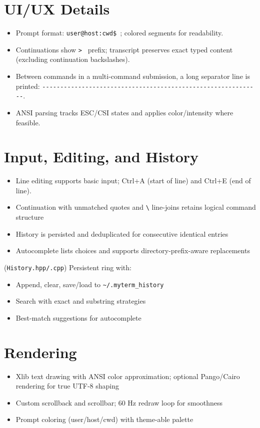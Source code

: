 \documentclass[11pt,a4paper]{article}
\begin{document}
\section{UI/UX Details}
\begin{itemize}[leftmargin=*]
  \item Prompt format: \verb!user@host:cwd$ !; colored segments for readability.
  \item Continuations show \verb!> ! prefix; transcript preserves exact typed content (excluding continuation backslashes).
  \item Between commands in a multi-command submission, a long separator line is printed: \verb!-------------------------------------------------------------!.
  \item ANSI parsing tracks ESC/CSI states and applies color/intensity where feasible.
\end{itemize}

\section{Input, Editing, and History}
\begin{itemize}[leftmargin=*]
  \item Line editing supports basic input; Ctrl+A (start of line) and Ctrl+E (end of line).
  \item Continuation with unmatched quotes and \texttt{\textbackslash} line-joins retains logical command structure
  \item History is persisted and deduplicated for consecutive identical entries
  \item Autocomplete lists choices and supports directory-prefix-aware replacements
\end{itemize}
(\texttt{History.hpp/.cpp}) Persistent ring with:
\begin{itemize}[leftmargin=*]
  \item Append, clear, save/load to \texttt{\textasciitilde/.myterm\_history}
  \item Search with exact and substring strategies
  \item Best-match suggestions for autocomplete
\end{itemize}

\section{Rendering}
\begin{itemize}[leftmargin=*]
  \item Xlib text drawing with ANSI color approximation; optional Pango/Cairo rendering for true UTF-8 shaping
  \item Custom scrollback and scrollbar; 60 Hz redraw loop for smoothness
  \item Prompt coloring (user/host/cwd) with theme-able palette
\end{itemize}
\end{document}
